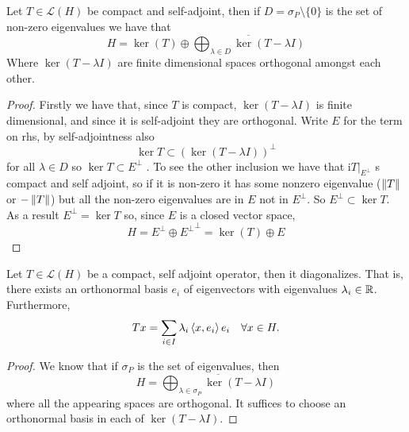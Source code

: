\documentclass[
    a4paper,
    DIV=14,
    abstract=true,
    numbers=noenddot
]{scrartcl}
\begin{document}
\begin{proposition}
	Let $T\in\mathcal{L}(H)$ be compact and self-adjoint, then if $D=\sigma_P\setminus\{0\}$ is the set of non-zero eigenvalues we have that
	\begin{equation*}
		H=\operatorname{ker}(T) \oplus \overline{\bigoplus_{\lambda \in D} \operatorname{ker}(T-\lambda I)}
	\end{equation*}
	Where $\operatorname{ker}(T-\lambda I)$ are finite dimensional spaces orthogonal amongst each other.
\end{proposition}
\begin{proof}
	Firstly we have that, since $T$ is compact, $\ker(T-\lambda I)$ is finite dimensional, and since it is self-adjoint they are orthogonal. Write $E$ for the term on rhs, by self-adjointness also
	\begin{equation*}
		\ker{T}\subset (\ker(T-\lambda I))^\perp
	\end{equation*}
	for all $\lambda\in D$ so $\ker{T}\subset E^\perp$  . To see the other inclusion we have that i$T|_{E^\perp}$ s compact and self adjoint, so if it is non-zero it has some nonzero eigenvalue ($\left\lVert T \right\rVert$ or $-\left\lVert T \right\rVert$) but all the non-zero eigenvalues are in $E$ not in $E^\perp$. So $E^\perp\subset\ker{T}$. As a result $E^\perp=\ker{T}$ so, since $E$ is a closed vector space,
	\begin{equation*}
		H=E^\perp\oplus {E^\perp}^\perp=\ker(T)\oplus E
	\end{equation*}
\end{proof}
\begin{theorem}\label{Hilber-Schmidt}
	Let $T\in\mathcal{L}(H)$ be a compact, self adjoint operator, then it diagonalizes. That is, there exists an orthonormal basis $e_i$ of eigenvectors with eigenvalues $\lambda_i\in\mathbb{R}$. Furthermore,
	\begin{equation*}
		Tx=\sum_{i\in I} \lambda_i\left\langle x,e_i\right\rangle e_i\quad\forall x\in H.
	\end{equation*}
\end{theorem}
\begin{proof}
	We know that if $\sigma_P$ is the set of eigenvalues, then
	\begin{equation*}
		H= \overline{\bigoplus_{\lambda \in \sigma_P} \operatorname{ker}(T-\lambda I)}
	\end{equation*}
	where all the appearing spaces are orthogonal. It suffices to choose an orthonormal basis in each of $\operatorname{ker}(T-\lambda I)$.
\end{proof}
\end{document}
